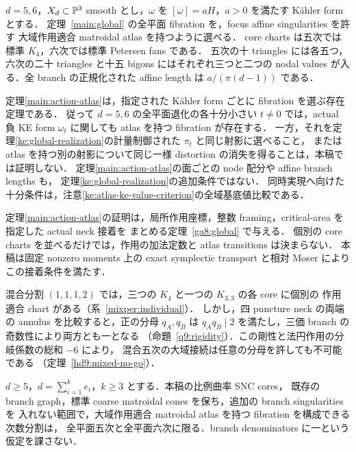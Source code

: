 \begin{theorem}\label{main:action-atlas}
$d=5,6$，$X_d\subset\mathbb P^3$ smooth とし，$\omega$ を
$[\omega]=aH$，$a>0$ を満たす Kähler form とする．
定理~\ref{main:global} の全平面 fibration を，focus affine singularities を許す
大域作用適合 matroidal atlas を持つように選べる．
core charts は五次では標準 $K_4$，六次では標準 Petersen fans である．
五次の十 triangles には各五つ，六次の二十 triangles と十五 bigons にはそれぞれ三つと二つの
nodal values が入る．全 branch の正規化された affine length は $a/(\pi(d-1))$ である．
\end{theorem}

\begin{remark}\label{main:atlas-ke-scope}
定理\ref{main:action-atlas}は，指定された Kähler form ごとに fibration を選ぶ存在定理である．
従って $d=5,6$ の全平面退化の各十分小さい $t\ne0$ では，actual 負 KE form
$\omega_t$ に関しても atlas を持つ fibration が存在する．
一方，それを定理\ref{ke:global-realization}の計量制御された $\pi_t$ と同じ射影に選べること，
または atlas を持つ別の射影について同じ一様 distortion の消失を得ることは，本稿では証明しない．
定理\ref{main:action-atlas}の面ごとの node 配分や affine branch lengths も，
定理\ref{ke:global-realization}の追加条件ではない．
同時実現へ向けた十分条件は，注意\ref{ke:atlas-ke-value-criterion}の全域基底値比較である．
\end{remark}

定理\ref{main:action-atlas}の証明は，局所作用座標，整数 framing，critical-area を指定した actual neck 接着を
まとめる定理~\ref{ga8:global} で与える．
個別の core charts を並べるだけでは，作用の加法定数と atlas transitions は決まらない．
本稿は固定 nonzero moments 上の exact symplectic transport と相対 Moser により
この接着条件を満たす．

混合分割 $(1,1,1,2)$ では，三つの $K_4$ と一つの $K_{3,3}$ の各 core に個別の
作用適合 chart がある（系~\ref{mixper:individual}）．
しかし，四 puncture neck の両端の annulus を比較すると，正の分母 $q_A,q_B$ は
$q_Aq_B\mid2$ を満たし，三価 branch の奇数性により両方とも一となる
（命題~\ref{q9:rigidity}）．この剛性と法円作用の分岐係数の総和 $-6$ により，
混合五次の大域接続は任意の分母を許しても不可能である
（定理~\ref{hd9:mixed-no-go}）．

\begin{theorem}\label{main:atlas-classification}
$d\ge5$，$d=\sum_{i=1}^ke_i$，$k\ge3$ とする．本稿の比例曲率 SNC cores，
既存の branch graph，標準 coarse matroidal cones を保ち，追加の branch singularities を
入れない範囲で，大域作用適合 matroidal atlas を持つ fibration を構成できる次数分割は，
全平面五次と全平面六次に限る．branch denominators に一という仮定を課さない．
\end{theorem}

